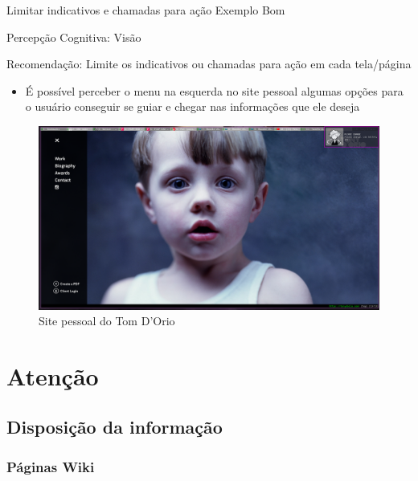 \documentclass{beamer}
\begin{document}
\begin{frame}{Limitar indicativos e chamadas para ação Exemplo Bom}

Percepção Cognitiva: Visão

Recomendação: Limite os indicativos ou chamadas para ação em cada tela/página

\begin{itemize}
    \item É possível perceber o menu na esquerda no site pessoal algumas opções para o usuário conseguir se guiar e chegar nas informações que ele deseja
\end{itemize}
\begin{figure}
    \centering
    \includegraphics[scale=0.15]{images/Tomd.png}
    \caption{Site pessoal do Tom D'Orio}
\end{figure}

\end{frame}

\section{Atenção}
\subsection{Disposição da informação}
\subsubsection{Páginas Wiki}
\end{document}

